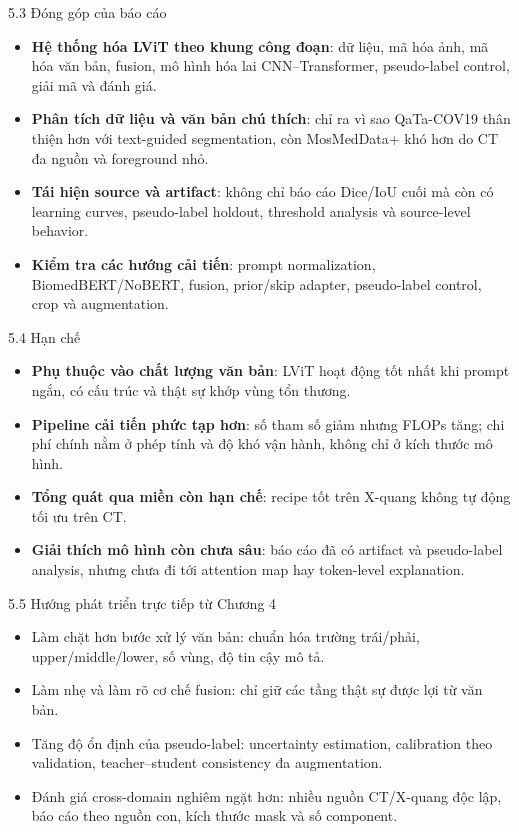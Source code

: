 \documentclass[aspectratio=169,11pt]{beamer}
\begin{document}
\begin{frame}{5.3 Đóng góp của báo cáo}
  \begin{itemize}
    \item \textbf{Hệ thống hóa LViT theo khung công đoạn}: dữ liệu, mã hóa ảnh, mã hóa văn bản, fusion, mô hình hóa lai CNN--Transformer, pseudo-label control, giải mã và đánh giá.
    \item \textbf{Phân tích dữ liệu và văn bản chú thích}: chỉ ra vì sao QaTa-COV19 thân thiện hơn với text-guided segmentation, còn MosMedData+ khó hơn do CT đa nguồn và foreground nhỏ.
    \item \textbf{Tái hiện source và artifact}: không chỉ báo cáo Dice/IoU cuối mà còn có learning curves, pseudo-label holdout, threshold analysis và source-level behavior.
    \item \textbf{Kiểm tra các hướng cải tiến}: prompt normalization, BiomedBERT/NoBERT, fusion, prior/skip adapter, pseudo-label control, crop và augmentation.
  \end{itemize}
\end{frame}

\begin{frame}{5.4 Hạn chế}
  \begin{itemize}
    \item \textbf{Phụ thuộc vào chất lượng văn bản}: LViT hoạt động tốt nhất khi prompt ngắn, có cấu trúc và thật sự khớp vùng tổn thương.
    \item \textbf{Pipeline cải tiến phức tạp hơn}: số tham số giảm nhưng FLOPs tăng; chi phí chính nằm ở phép tính và độ khó vận hành, không chỉ ở kích thước mô hình.
    \item \textbf{Tổng quát qua miền còn hạn chế}: recipe tốt trên X-quang không tự động tối ưu trên CT.
    \item \textbf{Giải thích mô hình còn chưa sâu}: báo cáo đã có artifact và pseudo-label analysis, nhưng chưa đi tới attention map hay token-level explanation.
  \end{itemize}
\end{frame}

\begin{frame}{5.5 Hướng phát triển trực tiếp từ Chương 4}
  \begin{itemize}
    \item Làm chặt hơn bước xử lý văn bản: chuẩn hóa trường trái/phải, upper/middle/lower, số vùng, độ tin cậy mô tả.
    \item Làm nhẹ và làm rõ cơ chế fusion: chỉ giữ các tầng thật sự được lợi từ văn bản.
    \item Tăng độ ổn định của pseudo-label: uncertainty estimation, calibration theo validation, teacher--student consistency đa augmentation.
    \item Đánh giá cross-domain nghiêm ngặt hơn: nhiều nguồn CT/X-quang độc lập, báo cáo theo nguồn con, kích thước mask và số component.
  \end{itemize}
\end{frame}
\end{document}
